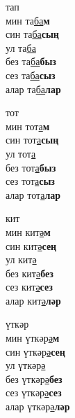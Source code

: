 \begin{multicols}{4}
\begin{enumerate}
\begin{minipage}{\linewidth}
    \item
    тап\\
    мин та\underline{ба}\textbf{м}\\
    син та\underline{ба}\textbf{сың}\\
    ул та\underline{ба}\\
    без та\underline{ба}\textbf{быз}\\
    сез та\underline{ба}\textbf{сыз}\\
    алар та\underline{ба}\textbf{лар}\\
\end{minipage}

\begin{minipage}{\linewidth}
    \item
    тот\\
    мин тот\underline{а}\textbf{м}\\
    син тот\underline{а}\textbf{сың}\\
    ул тот\underline{а}\\
    без тот\underline{а}\textbf{быз}\\
    сез тот\underline{а}\textbf{сыз}\\
    алар тот\underline{а}\textbf{лар}\\
\end{minipage}

\begin{minipage}{\linewidth}
    \item
    кит\\
    мин кит\underline{ә}\textbf{м}\\
    син кит\underline{ә}\textbf{сең}\\
    ул кит\underline{ә}\\
    без кит\underline{ә}\textbf{без}\\
    сез кит\underline{ә}\textbf{сез}\\
    алар кит\underline{ә}\textbf{ләр}\\
\end{minipage}

\begin{minipage}{\linewidth}
    \item
    үткәр\\
    мин үткәр\underline{ә}\textbf{м}\\
    син үткәр\underline{ә}\textbf{сең}\\
    ул үткәр\underline{ә}\\
    без үткәр\underline{ә}\textbf{без}\\
    сез үткәр\underline{ә}\textbf{сез}\\
    алар үткәр\underline{ә}\textbf{ләр}\\
\end{minipage}


\end{enumerate}
\end{multicols}
